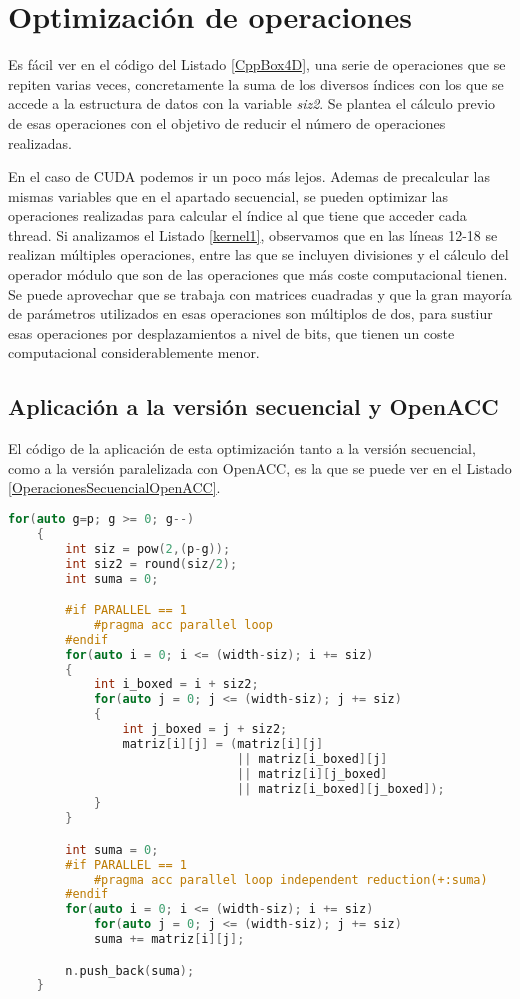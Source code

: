 \section{Optimización de operaciones}
Es fácil ver en el código del Listado \ref{CppBox4D}, una serie de operaciones que se repiten varias veces, concretamente la suma de los diversos índices con los que se accede a la estructura de datos con la variable \textit{siz2}. Se plantea el cálculo previo de esas operaciones con el objetivo de reducir el número de operaciones realizadas.

En el caso de CUDA podemos ir un poco más lejos. Ademas de precalcular las mismas variables que en el apartado secuencial, se pueden optimizar las operaciones realizadas para calcular el índice al que tiene que acceder cada thread. Si analizamos el Listado \ref{kernel1}, observamos que en las líneas 12-18 se realizan múltiples operaciones, entre las que se incluyen divisiones y el cálculo del operador módulo que son de las operaciones que más coste computacional tienen. Se puede aprovechar que se trabaja con matrices cuadradas y que la gran mayoría de parámetros utilizados en esas operaciones son múltiplos de dos, para sustiur esas operaciones por desplazamientos a nivel de bits, que tienen un coste computacional considerablemente menor.

\subsection{Aplicación a la versión secuencial y OpenACC}

El código de la aplicación de esta optimización tanto a la versión secuencial, como a la versión paralelizada con OpenACC, es la que se puede ver en el Listado \ref{OperacionesSecuencialOpenACC}.

\begin{lstlisting}[language=C++,caption={Optimización de operaciones aplicada al Boxcount2D tanto en su versión secuencial como en su versión con OpenACC},label=OperacionesSecuencialOpenACC]
    for(auto g=p; g >= 0; g--)
    {
        int siz = pow(2,(p-g));
        int siz2 = round(siz/2);
        int suma = 0;

        #if PARALLEL == 1
            #pragma acc parallel loop 
        #endif
        for(auto i = 0; i <= (width-siz); i += siz)
        {
            int i_boxed = i + siz2;
            for(auto j = 0; j <= (width-siz); j += siz)
            {
                int j_boxed = j + siz2;
                matriz[i][j] = (matriz[i][j] 
                                || matriz[i_boxed][j] 
                                || matriz[i][j_boxed] 
                                || matriz[i_boxed][j_boxed]);
            }
        }

        int suma = 0; 
        #if PARALLEL == 1
            #pragma acc parallel loop independent reduction(+:suma)
        #endif
        for(auto i = 0; i <= (width-siz); i += siz)
            for(auto j = 0; j <= (width-siz); j += siz)
            suma += matriz[i][j];

        n.push_back(suma);
    }
\end{lstlisting}

